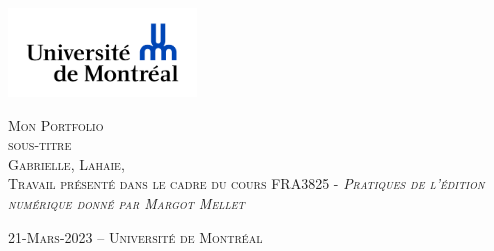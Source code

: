 \documentclass[12pt,french,letterpaper]{article}
\subtitle{sous-titre}
\author{Gabrielle    Lahaie    Université de Montréal }
\date{}
\begin{document}

\begin{titlepage}%
\begin{center}
    \enlargethispage{2cm}
    
\includegraphics[width = 50mm]{logo} %

\vspace*{3cm}
\scshape\Huge Mon Portfolio\\
\normalfont\Large sous-titre\\
\large \vspace*{3cm}
Gabrielle,  Lahaie,  
\\
\normalsize\vspace*{1cm}Travail présenté dans le cadre du cours FRA3825 - \em Pratiques
de l'édition numérique
 \normalfont donné par Margot Mellet 

\vspace*{3cm}
\end{center}

\vspace*{\fill}
\begin{flushright}
\end{flushright}

\begin{center}
\scshape\normalsize\vspace*{1cm} 21-Mars-2023 --      Université de
Montréal 
\\
\end{center}
\end{titlepage}




\newpage 
\end{document}
